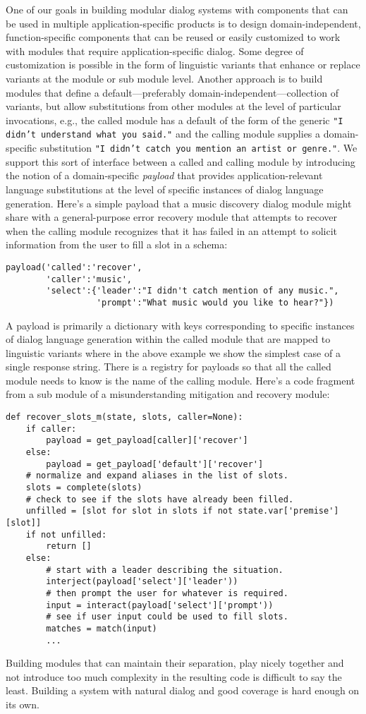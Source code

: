 \documentclass[letterpaper,11pt]{article}
\begin{document}
One of our goals in building modular dialog systems with components that can be used in multiple application-specific products is to design domain-independent, function-specific components that can be reused or easily customized to work with modules that require application-specific dialog.  Some degree of customization is possible in the form of linguistic variants that enhance or replace variants at the module or sub module level. Another approach is to build modules that define a default---preferably domain-independent---collection of variants, but allow substitutions from other modules at the level of particular invocations, e.g., the called module has a default of the form of the generic {\tt{"I didn't understand what you said."}} and the calling module supplies a domain-specific substitution {\tt{"I didn't catch you mention an artist or genre."}}.
%
We support this sort of interface between a called and calling module by introducing the notion of a domain-specific {\it{payload}} that provides application-relevant language substitutions at the level of specific instances of dialog language generation. Here's a simple payload that a music discovery dialog module might share with a general-purpose error recovery module that attempts to recover when the calling module recognizes that it has failed in an attempt to solicit information from the user to fill a slot in a schema: 
%
\begin{verbatim}
payload('called':'recover',
        'caller':'music',
        'select':{'leader':"I didn't catch mention of any music.",
                  'prompt':"What music would you like to hear?"})
\end{verbatim}
%
A payload is primarily a dictionary with keys corresponding to specific instances of dialog language generation within the called module that are mapped to linguistic variants where in the above example we show the simplest case of a single response string. There is a registry for payloads so that all the called module needs to know is the name of the calling module. Here's a code fragment from a sub module of a misunderstanding mitigation and recovery module:
%
\begin{verbatim}
def recover_slots_m(state, slots, caller=None):
    if caller:
        payload = get_payload[caller]['recover']
    else:
        payload = get_payload['default']['recover']
    # normalize and expand aliases in the list of slots.
    slots = complete(slots)
    # check to see if the slots have already been filled. 
    unfilled = [slot for slot in slots if not state.var['premise'][slot]]
    if not unfilled:
        return []
    else:
        # start with a leader describing the situation.
        interject(payload['select']['leader'))
        # then prompt the user for whatever is required.
        input = interact(payload['select']['prompt'))
        # see if user input could be used to fill slots.
        matches = match(input)
        ...
\end{verbatim}
%
Building modules that can maintain their separation, play nicely together and not introduce too much complexity in the resulting code is difficult to say the least. Building a system with natural dialog and good coverage is hard enough on its own. 
\end{document}
